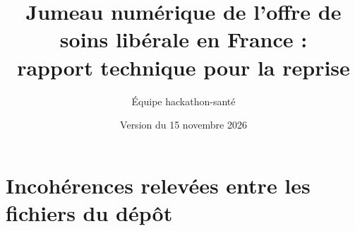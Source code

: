 \documentclass[11pt]{article}
\title{Jumeau numérique de l'offre de soins libérale en France :\\
rapport technique pour la reprise}
\author[1]{Équipe hackathon-santé}
\affil[1]{Dépôt \texttt{progdinh/hackathon\_acces\_soins}, dossier \texttt{v2/}}
\date{Version du 15 novembre 2026}
\begin{document}
\maketitle

\tableofcontents
\clearpage















\clearpage



\appendix
\section{Incohérences relevées entre les fichiers du dépôt}\label{ann:incoherences}






\end{document}
